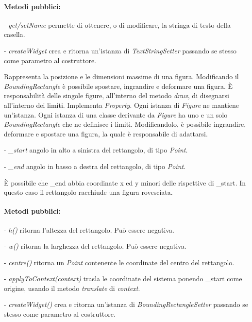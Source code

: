 \paragraph{Metodi pubblici:}
\begin{elencopuntato}[\subsubsecindent]
\item[-] \textit{get/setName} permette di ottenere, o di modificare, la stringa di testo della casella.
\item[-] \textit{createWidget} crea e ritorna un'istanza di \textit{TextStringSetter} passando se stesso come parametro al costruttore.
\end{elencopuntato}

Rappresenta la posizione e le dimensioni massime di una figura. Modificando il
\textit{BoundingRectangle} \`e possibile spostare, ingrandire e deformare una figura.
\`E responsabilit\`a delle singole figure, all'interno del metodo \textit{draw}, di disegnarsi all'interno dei limiti.
Implementa \textit{Property}. Ogni istanza di \textit{Figure} ne mantiene un'istanza.
Ogni istanza di una classe derivante da \textit{Figure} ha uno e un solo \textit{BoundingRectangle} che ne definisce i limiti. Modificandolo, \`e possibile ingrandire, deformare e spostare una figura, la quale \`e responsabile di adattarsi.
\begin{elencopuntato}[\subsubsecindent]
\item[-] \textit{{\_}start} angolo in alto a sinistra del rettangolo, di tipo \textit{Point}.
\item[-] \textit{{\_}end} angolo in basso a destra del rettangolo, di tipo \textit{Point}.
\end{elencopuntato}
\`E possibile che {\_}end abbia coordinate x ed y minori delle rispettive di {\_}start. In questo caso il rettangolo racchiude una figura rovesciata.
\paragraph{Metodi pubblici:}
\begin{elencopuntato}[\subsubsecindent]
\item[-] \textit{h()} ritorna l'altezza del rettangolo. Pu\`o essere negativa.
\item[-] \textit{w()} ritorna la larghezza del rettangolo. Pu\`o essere negativa.
\item[-] \textit{centre()} ritorna un \textit{Point} contenente le coordinate del centro del rettangolo.
\item[-] \textit{applyToContext(context)} trasla le coordinate del sistema ponendo {\_}start come origine, usando il metodo \textit{translate} di \textit{context}.
\item[-] \textit{createWidget()} crea e ritorna un'istanza di \textit{BoundingRectangleSetter} passando se stesso come parametro al costruttore.
\end{elencopuntato}


